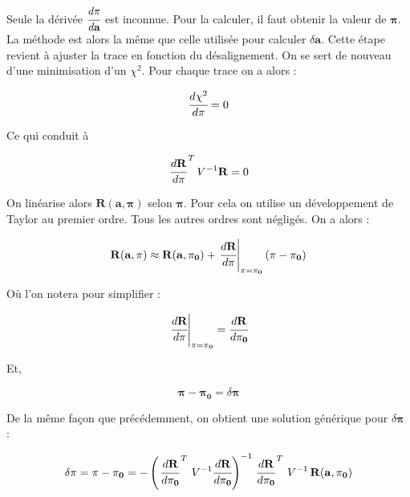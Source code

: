    Seule la d\'eriv\'ee $\cfrac{ d \mathbf{\pi} }{d \mathbf{a}}$ est inconnue. Pour la calculer, il faut obtenir la valeur de $\mathbf{\pi}$. La m\'ethode est alors la m\^eme que celle utilis\'ee pour calculer $\delta \mathbf{a}$. Cette \'etape revient \`a ajuster la trace en fonction du d\'esalignement. On se sert de nouveau d'une minimisation d'un $\chi^2$. Pour chaque trace on a alors :
   
   \begin{equation}
    \cfrac{d\chi^2}{d\mathbf{\pi}} = 0
    \label{eq:MiniChi2Trace}
   \end{equation}   
   
   Ce qui conduit \`a 
   
   \begin{equation}
    \left. \cfrac{ d \mathbf{R}}{d \mathbf{\pi}} \right.^T V^{-1} \mathbf{R} = 0
    \label{eq:mini_chi2_Pi}
   \end{equation}

   On lin\'earise alors $\mathbf{R}(\mathbf{a},\mathbf{\pi})$ selon $\mathbf{\pi}$. Pour cela on utilise un développement de Taylor au premier ordre. Tous les autres ordres sont n\'eglig\'es. On a alors :
   
   \begin{equation}
    \mathbf{R}(\mathbf{a},\mathbf{\pi}) \approx \mathbf{R}(\mathbf{a},\mathbf{\pi_0}) + \left. \cfrac{ d \mathbf{R}}{d \mathbf{\pi}}\right|_{\mathbf{\pi}=\mathbf{\pi_0}} (\mathbf{\pi}-\mathbf{\pi_0})
    \label{eq:lin_pi}
   \end{equation}

   O\`u l'on notera pour simplifier :
   
   \begin{equation}
    \left. \cfrac{ d \mathbf{R}}{d \mathbf{\pi}}\right|_{\mathbf{\pi}=\mathbf{\pi_0}} = \cfrac{ d \mathbf{R}}{d \mathbf{\pi_0}}
   \end{equation}
   
   Et,
   
   \begin{equation}
    \mathbf{\pi}-\mathbf{\pi_0} = \delta \mathbf{\pi}
   \end{equation}

   De la m\^eme façon que pr\'ec\'edemment, on obtient une solution g\'en\'erique pour $\delta \mathbf{\pi}$ :
   
   \begin{equation}
    \delta \mathbf{\pi} = \mathbf{\pi} -\mathbf{\pi_0} = - \left( \left. \cfrac{ d \mathbf{R}}{d \mathbf{\pi_0}} \right.^T \, V^{-1} \cfrac{ d \mathbf{R}}{d \mathbf{\pi_0}} \right)^{-1} \left. \cfrac{ d \mathbf{R}}{d \mathbf{\pi_0}} \right.^T \, V^{-1} \, \mathbf{R}(\mathbf{a}, \mathbf{\pi_0})
    \label{eq:solPi}
   \end{equation}
   
